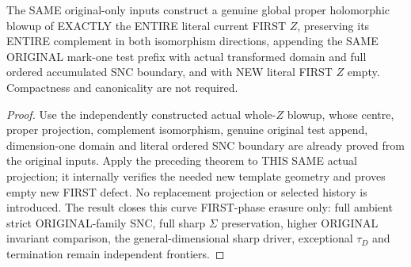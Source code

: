 \begin{theorem}
\label{hir:sharp-original-curve-global-first-defect-erasing-test-step}
\leanok
The SAME original-only inputs construct a genuine global proper
holomorphic blowup of EXACTLY the ENTIRE literal current FIRST $Z$,
preserving its ENTIRE complement in both isomorphism directions,
appending the SAME ORIGINAL mark-one test prefix with actual transformed
domain and full ordered accumulated SNC boundary, and with NEW literal
FIRST $Z$ empty. Compactness and canonicality are not required.
\end{theorem}
\begin{proof}
Use the independently constructed actual whole-$Z$ blowup, whose centre,
proper projection, complement isomorphism, genuine original test
append, dimension-one domain and literal ordered SNC boundary are
already proved from the original inputs. Apply the preceding theorem to
THIS SAME actual projection; it internally verifies the needed new
template geometry and proves empty new FIRST defect. No replacement
projection or selected history is introduced. The result closes this
curve FIRST-phase erasure only: full ambient strict ORIGINAL-family SNC,
full sharp $\Sigma$ preservation, higher ORIGINAL invariant comparison,
the general-dimensional sharp driver, exceptional $\tau_D$ and
termination remain independent frontiers.
\end{proof}
